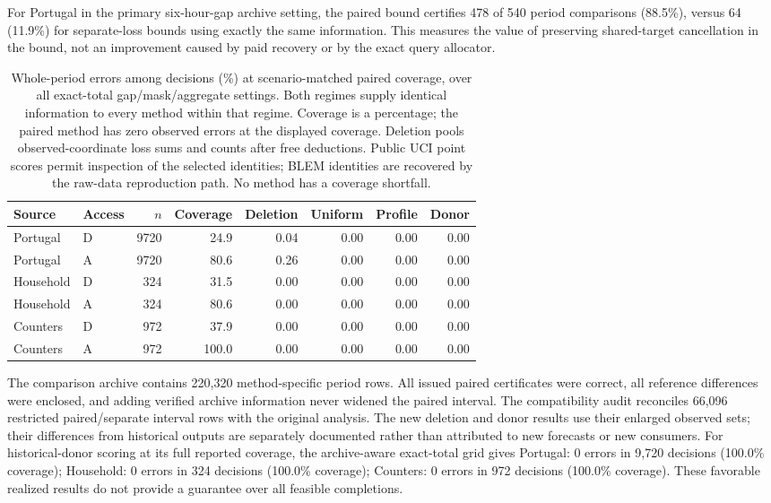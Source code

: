 \documentclass[12pt]{article}
\begin{document}
For Portugal in the primary six-hour-gap archive setting, the paired bound certifies 478 of 540 period comparisons (88.5\%), versus 64 (11.9\%) for separate-loss bounds using exactly the same information. This measures the value of preserving shared-target cancellation in the bound, not an improvement caused by paid recovery or by the exact query allocator.
\begin{table}[htbp]
\centering\normalsize\setlength{\tabcolsep}{4pt}
\caption{Whole-period errors among decisions (\%) at scenario-matched paired coverage, over all exact-total gap/mask/aggregate settings. Both regimes supply identical information to every method within that regime. Coverage is a percentage; the paired method has zero observed errors at the displayed coverage. Deletion pools observed-coordinate loss sums and counts after free deductions. Public UCI point scores permit inspection of the selected identities; BLEM identities are recovered by the raw-data reproduction path. No method has a coverage shortfall.}
\label{tab:matched}
\begin{tabular}{llrrrrrr}
\toprule
Source & Access & $n$ & Coverage & Deletion & Uniform & Profile & Donor\\
\midrule
Portugal & D & 9720 & 24.9 & 0.04 & 0.00 & 0.00 & 0.00\\
Portugal & A & 9720 & 80.6 & 0.26 & 0.00 & 0.00 & 0.00\\
Household & D & 324 & 31.5 & 0.00 & 0.00 & 0.00 & 0.00\\
Household & A & 324 & 80.6 & 0.00 & 0.00 & 0.00 & 0.00\\
Counters & D & 972 & 37.9 & 0.00 & 0.00 & 0.00 & 0.00\\
Counters & A & 972 & 100.0 & 0.00 & 0.00 & 0.00 & 0.00\\
\bottomrule
\end{tabular}
\end{table}

The comparison archive contains 220,320
method-specific period rows. All issued paired certificates were correct,
all reference differences were enclosed, and adding verified archive
information never widened the paired interval. The compatibility audit
reconciles 66,096
restricted paired/separate interval rows with the original analysis.
The new deletion and donor results use their enlarged observed sets;
their differences from historical outputs are separately documented rather
than attributed to new forecasts or new consumers.
For historical-donor scoring at its full reported coverage, the archive-aware exact-total grid gives Portugal: 0 errors in 9,720 decisions (100.0\% coverage); Household: 0 errors in 324 decisions (100.0\% coverage); Counters: 0 errors in 972 decisions (100.0\% coverage). These favorable realized results do not provide a guarantee over all feasible completions.
\end{document}
